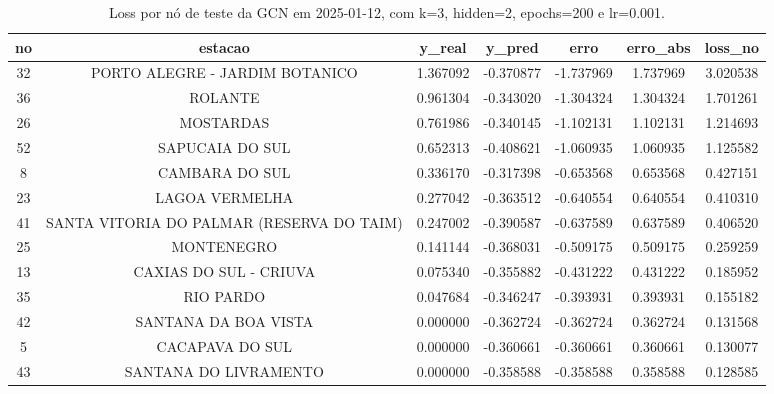 \begin{table}[h]
\centering
\caption{Loss por nó de teste da GCN em 2025-01-12, com k=3, hidden=2, epochs=200 e lr=0.001.}
\label{tab:gcn_loss_nodes_k3_hidden2}
\begin{tabular}{ccccccc}
\toprule
no & estacao & y\_real & y\_pred & erro & erro\_abs & loss\_no \\
\midrule
32 & PORTO ALEGRE - JARDIM BOTANICO & 1.367092 & -0.370877 & -1.737969 & 1.737969 & 3.020538 \\
36 & ROLANTE & 0.961304 & -0.343020 & -1.304324 & 1.304324 & 1.701261 \\
26 & MOSTARDAS & 0.761986 & -0.340145 & -1.102131 & 1.102131 & 1.214693 \\
52 & SAPUCAIA DO SUL & 0.652313 & -0.408621 & -1.060935 & 1.060935 & 1.125582 \\
8 & CAMBARA DO SUL & 0.336170 & -0.317398 & -0.653568 & 0.653568 & 0.427151 \\
23 & LAGOA VERMELHA & 0.277042 & -0.363512 & -0.640554 & 0.640554 & 0.410310 \\
41 & SANTA VITORIA DO PALMAR (RESERVA DO TAIM) & 0.247002 & -0.390587 & -0.637589 & 0.637589 & 0.406520 \\
25 & MONTENEGRO & 0.141144 & -0.368031 & -0.509175 & 0.509175 & 0.259259 \\
13 & CAXIAS DO SUL - CRIUVA & 0.075340 & -0.355882 & -0.431222 & 0.431222 & 0.185952 \\
35 & RIO PARDO & 0.047684 & -0.346247 & -0.393931 & 0.393931 & 0.155182 \\
42 & SANTANA DA BOA VISTA & 0.000000 & -0.362724 & -0.362724 & 0.362724 & 0.131568 \\
5 & CACAPAVA DO SUL & 0.000000 & -0.360661 & -0.360661 & 0.360661 & 0.130077 \\
43 & SANTANA DO LIVRAMENTO & 0.000000 & -0.358588 & -0.358588 & 0.358588 & 0.128585 \\
\bottomrule
\end{tabular}
\end{table}
